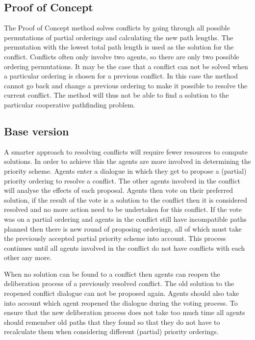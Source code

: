 \documentclass[a4paper]{article}
\begin{document}
\subsection{Proof of Concept}
The Proof of Concept method solves conflicts by going through all possible
permutations of partial orderings and calculating the new path lengths. The permutation
with the lowest total path length is used as the solution for the conflict.
Conflicts often only involve two agents, so there are only two possible
ordering permutations. It may be the case that a conflict can not be solved
when a particular ordering is chosen for a previous conflict. In this case the
method cannot go back and change a previous ordering to make it possible to
resolve the current conflict. The method will thus not be able to find a
solution to the particular cooperative pathfinding problem.

\subsection{Base version}
A smarter approach to resolving conflicts will require fewer resources to
compute solutions. In order to achieve this the agents are more involved in
determining the priority scheme. Agents enter a dialogue in which they get to
propose a (partial) priority
ordering to resolve a conflict. The other agents involved in the conflict will
analyse the effects of each proposal. Agents then vote on their preferred
solution, if the result of the vote is a solution to the conflict then it is
considered resolved and no more action need to be undertaken for this conflict.
If the vote was on a partial ordering and agents in the conflict still have
incompatible paths planned then there is  new round of proposing orderings, all
of which must take the previously accepted partial priority scheme into
account. This process continues until all agents involved in the conflict do
not have conflicts with each other any more.

When no solution can be found to a conflict then agents can reopen the
deliberation process of a previously resolved conflict. The old solution to the
reopened conflict dialogue can not be proposed again. Agents should also take
into account which agent reopened the dialogue during the voting process. To
ensure that the new deliberation process does not take too much time all agents
should remember old paths that they found so that they do not have to
recalculate them when considering different (partial) priority orderings.
\end{document}

